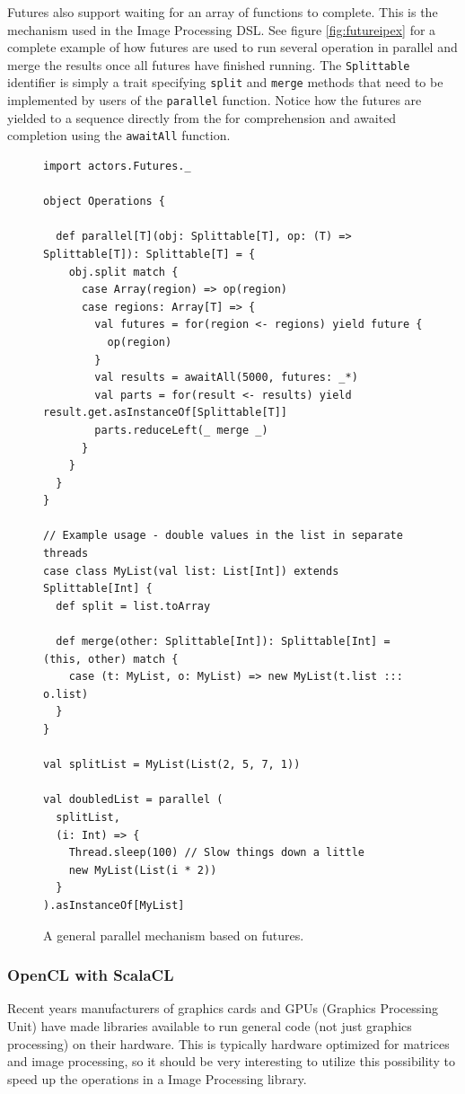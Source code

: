 \documentclass[a4paper,english]{report}
\begin{document}
Futures also support waiting for an array of functions to
complete. This is the mechanism used in the Image Processing DSL. See
figure \vref{fig:futureipex} for a complete example of how futures are
used to run several operation in parallel and merge the results once
all futures have finished running. The \texttt{Splittable} identifier
is simply a trait specifying \texttt{split} and \texttt{merge} methods
that need to be implemented by users of the \texttt{parallel}
function. Notice how the futures are yielded to a sequence directly
from the for comprehension and awaited completion using the
\texttt{awaitAll} function.

\begin{figure}
  \begin{lstlisting}
import actors.Futures._

object Operations {

  def parallel[T](obj: Splittable[T], op: (T) => Splittable[T]): Splittable[T] = {
    obj.split match {
      case Array(region) => op(region)
      case regions: Array[T] => {
        val futures = for(region <- regions) yield future {
          op(region)
        }
        val results = awaitAll(5000, futures: _*)
        val parts = for(result <- results) yield result.get.asInstanceOf[Splittable[T]]
        parts.reduceLeft(_ merge _)
      }
    }
  }
}

// Example usage - double values in the list in separate threads
case class MyList(val list: List[Int]) extends Splittable[Int] {
  def split = list.toArray
  
  def merge(other: Splittable[Int]): Splittable[Int] = (this, other) match {
    case (t: MyList, o: MyList) => new MyList(t.list ::: o.list)
  }
}

val splitList = MyList(List(2, 5, 7, 1))

val doubledList = parallel (
  splitList,
  (i: Int) => {
    Thread.sleep(100) // Slow things down a little
    new MyList(List(i * 2))
  }
).asInstanceOf[MyList]
  \end{lstlisting}
  \caption{A general parallel mechanism based on
    futures.\label{fig:futureipex}}
\end{figure}

\subsubsection{OpenCL with ScalaCL}
\label{sec:opencl}

Recent years manufacturers of graphics cards and GPUs (Graphics
Processing Unit) have made libraries available to run general code
(not just graphics processing) on their hardware. This is typically
hardware optimized for matrices and image processing, so it should be
very interesting to utilize this possibility to speed up the
operations in a Image Processing library.
\end{document}
